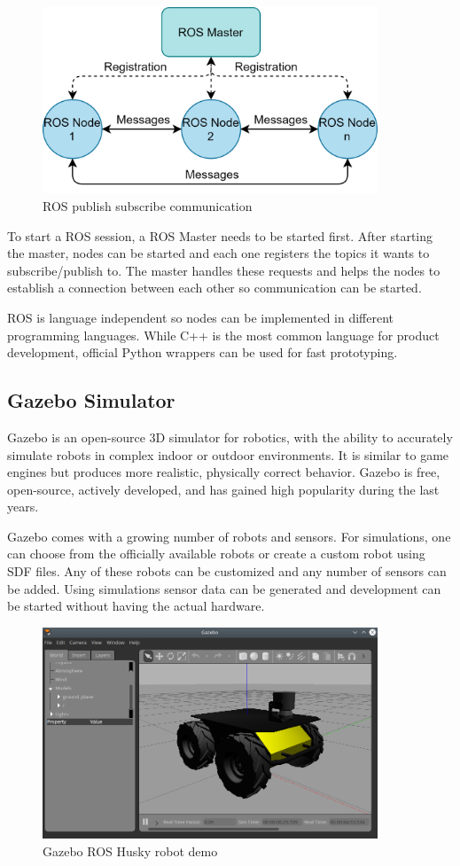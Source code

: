 \begin{figure}[!ht]
    \centering
    \includegraphics[width=100mm, keepaspectratio]{figures/ros_pubsub.png}
    \caption{ROS publish subscribe communication}
    \label{fig:ros_pubsub}
\end{figure}

To start a ROS session, a ROS Master needs to be started first. After starting the master, nodes can be 
started and each one registers the topics it wants to subscribe/publish to. The master handles these requests
and helps the nodes to establish a connection between each other so communication can be started. 

ROS is language independent so nodes can be implemented in different programming languages. While C++ is 
the most common language for product development, official Python wrappers can be used for fast 
prototyping.


\subsection{Gazebo Simulator}
Gazebo\cite{GazeboWebsite} is an open-source 3D simulator for robotics, with the ability to accurately simulate robots in complex
indoor or outdoor environments. It is similar to game engines but produces more realistic, physically correct
behavior. Gazebo is free, open-source, actively developed, and has gained high popularity during the last years. 

Gazebo comes with a growing number of robots and sensors. For simulations, one can choose from the officially 
available robots or create a custom robot using SDF files. Any of these robots can be customized and any 
number of sensors can be added. Using simulations sensor data can be generated and development can be started 
without having the actual hardware.

\begin{figure}[h]
    \centering
    \includegraphics[width=100mm, keepaspectratio]{figures/husky.png}
    \caption{Gazebo ROS Husky robot demo}
    \label{fig:ros_husky}
\end{figure}

